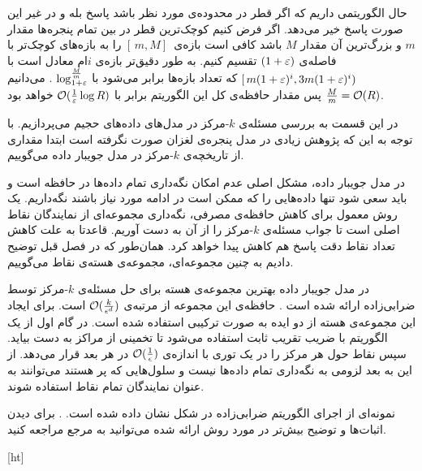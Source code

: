 حال الگوریتمی داریم که اگر قطر در محدوده‌ی مورد نظر باشد پاسخ بله و در غیر این صورت پاسخ خیر می‌دهد. اگر فرض کنیم کوچک‌ترین قطر در بین تمام پنجره‌ها مقدار $m$ و بزرگ‌ترین آن مقدار $M$ باشد کافی است بازه‌ی 
$ [\,m, M]\,$
را به بازه‌های کوچک‌تر با فاصله‌ی $(1+\varepsilon) $ تقسیم کنیم. به طور دقیق‌تر بازه‌ی $i$ام معادل است با
$ [\, m (1+\varepsilon)^i, 3 m (1+ \varepsilon)^i )$
که تعداد بازه‌ها برابر می‌‌شود با 
$ \log_{1+\varepsilon}^{\frac{M}{m}}$
. می‌دانیم
$\frac{M}{m} = \mathcal{O}(R)$
پس مقدار حافظه‌ی کل این الگوریتم برابر با
$\mathcal{O}(\frac{1}{\varepsilon} \log R)$
خواهد بود.


در این قسمت به بررسی مسئله‌ی $k$-مرکز در مدل‌های داده‌های حجیم می‌پردازیم. با توجه به این که پژوهش زیادی در مدل پنجره‌ی لغزان صورت نگرفته است ابتدا مقداری از تاریخچه‌ی $k$-مرکز در مدل جویبار داده می‌گوییم.

در مدل جویبار داده، مشکل اصلی عدم امکان نگه‌داری تمام داده‌ها در حافظه است و باید سعی شود تنها داده‌هایی را که ممکن است در ادامه مورد نیاز باشند نگه‌داریم.
یک روش معمول برای کاهش حافظه‌ی مصرفی، نگه‌داری مجموعه‌ای از نمایندگان نقاط اصلی است تا جواب مسئله‌ی $k$-مرکز را از آن به دست آوریم. قاعدتا به علت کاهش تعداد نقاط دقت پاسخ هم کاهش پیدا خواهد کرد. همان‌طور که در فصل قبل توضیح دادیم به چنین مجموعه‌ای، مجموعه‌ی هسته‌ی نقاط می‌گوییم.

در مدل جویبار داده بهترین مجموعه‌ی هسته برای حل مسئله‌ی $k$-مرکز توسط ضرابی‌زاده ارائه شده است .  حافظه‌ی این مجموعه از مرتبه‌ی $\mathcal{O}(\frac{k}{\epsilon^d})$ است. برای ایجاد این مجموعه‌ی هسته از دو ایده به صورت ترکیبی استفاده شده است. در گام اول از یک الگوریتم با ضریب تقریب ثابت استفاده می‌شود تا تخمینی از مراکز به دست بیاید. سپس نقاط حول هر مرکز را در یک توری با اندازه‌ی $\mathcal{O}(\frac{1}{\epsilon})$  در هر بعد قرار می‌دهد. از این به بعد لزومی به نگه‌داری تمام داده‌ها نیست و سلول‌هایی که پر هستند می‌توانند به عنوان نمایندگان تمام نقاط استفاده شوند.

نمونه‌ای از اجرای الگوریتم ضرابی‌زاده در شکل  نشان داده شده است. .
برای دیدن اثبات‌ها و توضیح بیش‌تر در مورد روش ارائه شده می‌توانید به مرجع  مراجعه کنید.

[ht]

